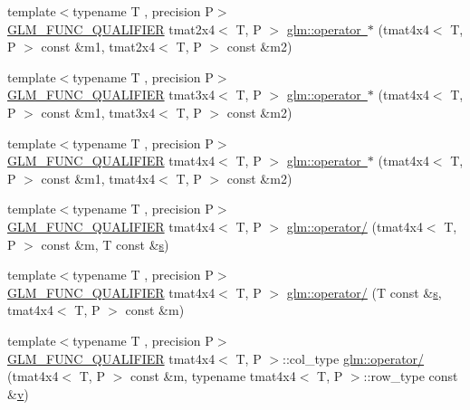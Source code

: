 \begin{DoxyCompactItemize}
\item 
{\footnotesize template$<$typename T , precision P$>$ }\\\mbox{\hyperlink{setup_8hpp_a33fdea6f91c5f834105f7415e2a64407}{G\+L\+M\+\_\+\+F\+U\+N\+C\+\_\+\+Q\+U\+A\+L\+I\+F\+I\+ER}} tmat2x4$<$ T, P $>$ \mbox{\hyperlink{namespaceglm_a6ff3e1cd7a34fe1719833907439d78d2}{glm\+::operator $\ast$}} (tmat4x4$<$ T, P $>$ const \&m1, tmat2x4$<$ T, P $>$ const \&m2)
\item 
{\footnotesize template$<$typename T , precision P$>$ }\\\mbox{\hyperlink{setup_8hpp_a33fdea6f91c5f834105f7415e2a64407}{G\+L\+M\+\_\+\+F\+U\+N\+C\+\_\+\+Q\+U\+A\+L\+I\+F\+I\+ER}} tmat3x4$<$ T, P $>$ \mbox{\hyperlink{namespaceglm_a98f499e0f5e29b32fecff8212c15d274}{glm\+::operator $\ast$}} (tmat4x4$<$ T, P $>$ const \&m1, tmat3x4$<$ T, P $>$ const \&m2)
\item 
{\footnotesize template$<$typename T , precision P$>$ }\\\mbox{\hyperlink{setup_8hpp_a33fdea6f91c5f834105f7415e2a64407}{G\+L\+M\+\_\+\+F\+U\+N\+C\+\_\+\+Q\+U\+A\+L\+I\+F\+I\+ER}} tmat4x4$<$ T, P $>$ \mbox{\hyperlink{namespaceglm_a9373aef0a78b31b934eb54017c55208c}{glm\+::operator $\ast$}} (tmat4x4$<$ T, P $>$ const \&m1, tmat4x4$<$ T, P $>$ const \&m2)
\item 
{\footnotesize template$<$typename T , precision P$>$ }\\\mbox{\hyperlink{setup_8hpp_a33fdea6f91c5f834105f7415e2a64407}{G\+L\+M\+\_\+\+F\+U\+N\+C\+\_\+\+Q\+U\+A\+L\+I\+F\+I\+ER}} tmat4x4$<$ T, P $>$ \mbox{\hyperlink{namespaceglm_ae255ad250d33a8cfb077044ce0950c27}{glm\+::operator/}} (tmat4x4$<$ T, P $>$ const \&m, T const \&\mbox{\hyperlink{glad_8h_af1b1d5edfea6a34daee7389b1b5810ad}{s}})
\item 
{\footnotesize template$<$typename T , precision P$>$ }\\\mbox{\hyperlink{setup_8hpp_a33fdea6f91c5f834105f7415e2a64407}{G\+L\+M\+\_\+\+F\+U\+N\+C\+\_\+\+Q\+U\+A\+L\+I\+F\+I\+ER}} tmat4x4$<$ T, P $>$ \mbox{\hyperlink{namespaceglm_a061e49063426cd16bad20d2916f281ca}{glm\+::operator/}} (T const \&\mbox{\hyperlink{glad_8h_af1b1d5edfea6a34daee7389b1b5810ad}{s}}, tmat4x4$<$ T, P $>$ const \&m)
\item 
{\footnotesize template$<$typename T , precision P$>$ }\\\mbox{\hyperlink{setup_8hpp_a33fdea6f91c5f834105f7415e2a64407}{G\+L\+M\+\_\+\+F\+U\+N\+C\+\_\+\+Q\+U\+A\+L\+I\+F\+I\+ER}} tmat4x4$<$ T, P $>$\+::col\+\_\+type \mbox{\hyperlink{namespaceglm_ac86c24a679ceb1c0588e0cd9fa31df3d}{glm\+::operator/}} (tmat4x4$<$ T, P $>$ const \&m, typename tmat4x4$<$ T, P $>$\+::row\+\_\+type const \&\mbox{\hyperlink{glad_8h_a14cfbe2fc2234f5504618905b69d1e06}{v}})

\end{DoxyCompactItemize}
